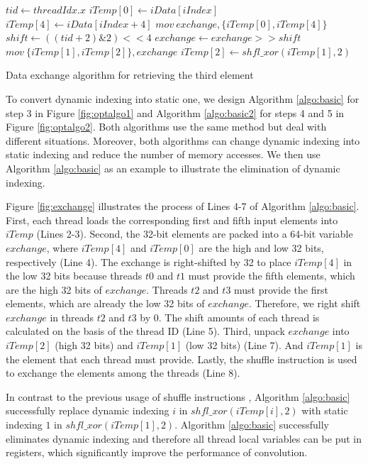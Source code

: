 \begin{algorithm}
	$tid \gets threadIdx.x$\;
	$iTemp[0] \gets iData[iIndex]$\;
	$iTemp[4] \gets iData[iIndex+4]$\;
	$mov\ exchange, \{iTemp[0], iTemp[4]\}$\;
	$shift \gets ((tid+2)\&2)<<4$\;
	$exchange \gets exchange >> shift$\;
	$mov\ \{iTemp[1],iTemp[2]\}, exchange$\;
	$iTemp[2] \gets shfl\_xor(iTemp[1],2)$\;	
	
	\caption{Data exchange algorithm for retrieving the third element}
	\label{algo:basic}
\end{algorithm}

To convert dynamic indexing into static one, we design Algorithm \ref{algo:basic} for step 3 in Figure \ref{fig:optalgo1} and
Algorithm \ref{algo:basic2} for steps 4 and 5 in Figure \ref{fig:optalgo2}. Both algorithms use the same method but deal with different
situations. Moreover, both algorithms can change dynamic indexing into static indexing and reduce the number of memory accesses. We then use Algorithm
\ref{algo:basic} as an example to illustrate the elimination of dynamic indexing.

Figure \ref{fig:exchange} illustrates the process of Lines 4-7 of Algorithm \ref{algo:basic}. First, each thread loads the corresponding first and fifth input elements into $iTemp$ (Lines 2-3). Second, the 32-bit elements are packed into a 64-bit variable $exchange$, where $iTemp[4]$ and $iTemp[0]$ are the high and low 32 bits, respectively (Line 4). The exchange is right-shifted by 32 to place $iTemp[4]$ in the low 32 bits because threads $t0$ and $t1$ must provide the fifth
elements, which are the high 32 bits of $exchange$. Threads $t2$ and $t3$ must provide the first elements, which are already the low 32 bits of $exchange$. Therefore, we right shift $exchange$ in threads $t2$ and $t3$ by 0. The shift amounts of each thread is calculated on the basis of the thread ID (Line 5). Third, unpack $exchange$ into $iTemp[2]$
(high 32 bits) and $iTemp[1]$ (low 32 bits) (Line 7). And $iTemp[1]$ is the element that each thread must provide. Lastly, the
shuffle instruction is used to exchange the elements among the threads (Line 8).

In contrast to the previous usage of shuffle instructions \cite{vasilache2014fast}, Algorithm \ref{algo:basic} successfully replace dynamic
indexing $i$ in $shfl\_xor(iTemp[i],2)$ with static indexing $1$ in $shfl\_xor(iTemp[1],2)$. Algorithm \ref{algo:basic} successfully
eliminates dynamic indexing and therefore all thread local variables can be put in registers, which significantly improve the performance
of convolution.

